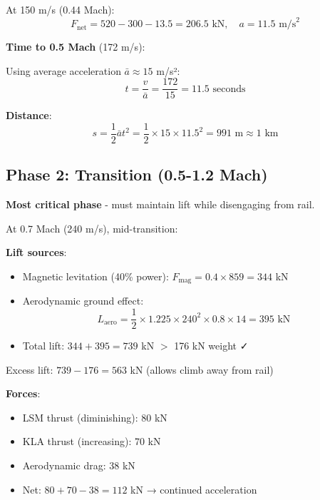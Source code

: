 \documentclass[12pt,a4paper]{article}
\begin{document}
At 150 m/s (0.44 Mach):
\begin{equation}
F_{\text{net}} = 520 - 300 - 13.5 = 206.5 \text{ kN}, \quad a = 11.5 \text{ m/s}^2
\end{equation}

\textbf{Time to 0.5 Mach} (172 m/s):

Using average acceleration $\bar{a} \approx 15$ m/s²:
\begin{equation}
t = \frac{v}{\bar{a}} = \frac{172}{15} = 11.5 \text{ seconds}
\end{equation}

\textbf{Distance}:
\begin{equation}
s = \frac{1}{2} \bar{a} t^2 = \frac{1}{2} \times 15 \times 11.5^2 = 991 \text{ m} \approx 1 \text{ km}
\end{equation}

\subsection{Phase 2: Transition (0.5-1.2 Mach)}

\textbf{Most critical phase} - must maintain lift while disengaging from rail.

At 0.7 Mach (240 m/s), mid-transition:

\textbf{Lift sources}:
\begin{itemize}
\item Magnetic levitation (40\% power): $F_{\text{mag}} = 0.4 \times 859 = 344$ kN
\item Aerodynamic ground effect:
\begin{equation}
L_{\text{aero}} = \frac{1}{2} \times 1.225 \times 240^2 \times 0.8 \times 14 = 395 \text{ kN}
\end{equation}
\item Total lift: $344 + 395 = 739$ kN $>$ 176 kN weight ✓
\end{itemize}

Excess lift: $739 - 176 = 563$ kN (allows climb away from rail)

\textbf{Forces}:
\begin{itemize}
\item LSM thrust (diminishing): 80 kN
\item KLA thrust (increasing): 70 kN
\item Aerodynamic drag: 38 kN
\item Net: $80 + 70 - 38 = 112$ kN → continued acceleration
\end{itemize}
\end{document}
